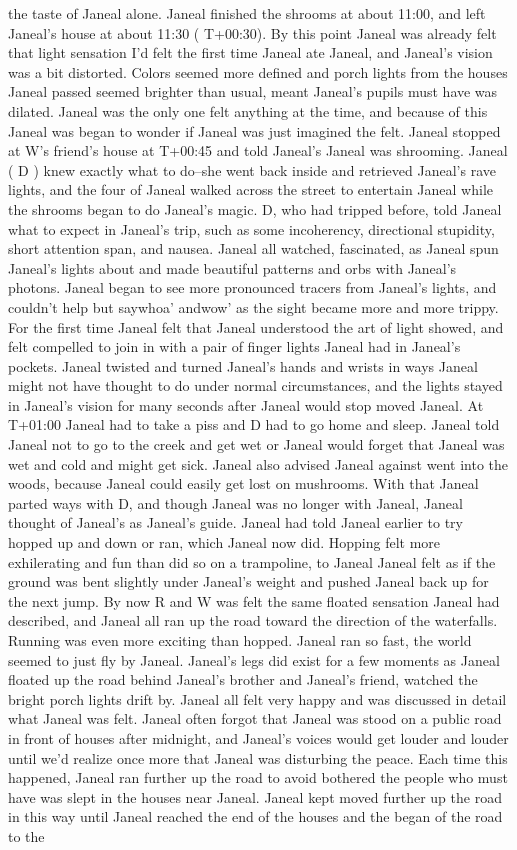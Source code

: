 \documentclass[12pt]{book}
\begin{document}
the taste of Janeal alone. Janeal finished the shrooms at about 11:00, and left Janeal's house at about 11:30 ( T+00:30). By this point Janeal was already felt that light sensation I'd felt the first time Janeal ate Janeal, and Janeal's vision was a bit distorted. Colors seemed more defined and porch lights from the houses Janeal passed seemed brighter than usual, meant Janeal's pupils must have was dilated. Janeal was the only one felt anything at the time, and because of this Janeal was began to wonder if Janeal was just imagined the felt. Janeal stopped at W's friend's house at T+00:45 and told Janeal's Janeal was shrooming. Janeal ( D ) knew exactly what to do--she went back inside and retrieved Janeal's rave lights, and the four of Janeal walked across the street to entertain Janeal while the shrooms began to do Janeal's magic. D, who had tripped before, told Janeal what to expect in Janeal's trip, such as some incoherency, directional stupidity, short attention span, and nausea. Janeal all watched, fascinated, as Janeal spun Janeal's lights about and made beautiful patterns and orbs with Janeal's photons. Janeal began to see more pronounced tracers from Janeal's lights, and couldn't help but saywhoa' andwow' as the sight became more and more trippy. For the first time Janeal felt that Janeal understood the art of light showed, and felt compelled to join in with a pair of finger lights Janeal had in Janeal's pockets. Janeal twisted and turned Janeal's hands and wrists in ways Janeal might not have thought to do under normal circumstances, and the lights stayed in Janeal's vision for many seconds after Janeal would stop moved Janeal. At T+01:00 Janeal had to take a piss and D had to go home and sleep. Janeal told Janeal not to go to the creek and get wet or Janeal would forget that Janeal was wet and cold and might get sick. Janeal also advised Janeal against went into the woods, because Janeal could easily get lost on mushrooms. With that Janeal parted ways with D, and though Janeal was no longer with Janeal, Janeal thought of Janeal's as Janeal's guide. Janeal had told Janeal earlier to try hopped up and down or ran, which Janeal now did. Hopping felt more exhilerating and fun than did so on a trampoline, to Janeal Janeal felt as if the ground was bent slightly under Janeal's weight and pushed Janeal back up for the next jump. By now R and W was felt the same floated sensation Janeal had described, and Janeal all ran up the road toward the direction of the waterfalls. Running was even more exciting than hopped. Janeal ran so fast, the world seemed to just fly by Janeal. Janeal's legs did exist for a few moments as Janeal floated up the road behind Janeal's brother and Janeal's friend, watched the bright porch lights drift by. Janeal all felt very happy and was discussed in detail what Janeal was felt. Janeal often forgot that Janeal was stood on a public road in front of houses after midnight, and Janeal's voices would get louder and louder until we'd realize once more that Janeal was disturbing the peace. Each time this happened, Janeal ran further up the road to avoid bothered the people who must have was slept in the houses near Janeal. Janeal kept moved further up the road in this way until Janeal reached the end of the houses and the began of the road to the 
\end{document}
